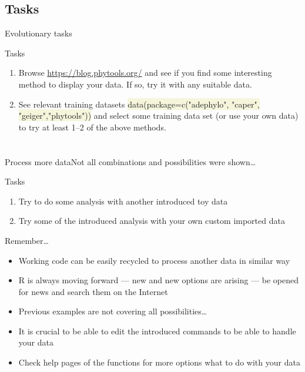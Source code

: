 \documentclass[compress, xelatex, 11pt, xcolor=svgnames, aspectratio=169, url={hyphens, lowtilde}]{beamer}
\renewcommand{\texttt}[1]{\colorbox{Beige}{{\ttfamily #1}}}
\begin{document}
\subsection{Tasks}

\begin{frame}{Evolutionary tasks}
	\begin{exampleblock}{Tasks}
		\begin{enumerate}
			\item Browse \url{https://blog.phytools.org/} and see if you find some interesting method to display your data. If so, try it with any suitable data.
			\item See relevant training datasets \texttt{data(package=c("adephylo", "caper", "geiger","phytools"))} and select some training data set (or use your own data) to try at least 1--2 of the above methods.
		\end{enumerate}
	\end{exampleblock}
\end{frame}

\section{}

\begin{frame}{Process more data}{Not all combinations and possibilities were shown\ldots}
	\begin{exampleblock}{Tasks}
		\begin{enumerate}
			\item Try to do some analysis with another introduced toy data
			\item Try some of the introduced analysis with your own custom imported data
		\end{enumerate}
	\end{exampleblock}
	\begin{alertblock}{Remember\ldots}
		\begin{itemize}
			\item Working code can be easily recycled to process another data in similar way
			\item R is always moving forward --- new and new options are arising --- be opened for news and search them on the Internet
			\item Previous examples are not covering all possibilities\ldots
			\item It is crucial to be able to edit the introduced commands to be able to handle your data
			\item Check help pages of the functions for more options what to do with your data
		\end{itemize}
	\end{alertblock}
\end{frame}
\end{document}
